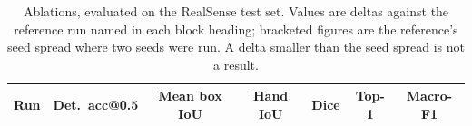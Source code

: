 \begin{table}[t]
\centering
\caption{Ablations, evaluated on the RealSense test set. Values are deltas against the reference run named in each block heading; bracketed figures are the reference's seed spread where two seeds were run. A delta smaller than the seed spread is not a result.}
\label{tab:ablation}
\begin{tabular}{lcccccc}
\toprule
Run & Det.\ acc@0.5 & Mean box IoU & Hand IoU & Dice & Top-1 & Macro-F1 \\
\bottomrule
\end{tabular}
\end{table}
